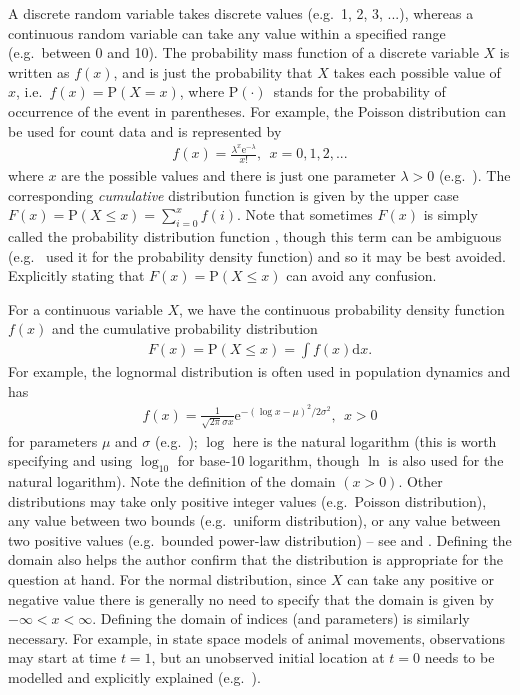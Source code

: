 \documentclass[12pt]{article}
\newcommand{\eb}{\begin{eqnarray}}
\newcommand{\ee}{\end{eqnarray}}
\begin{document}
A discrete random variable takes discrete values (e.g.~1, 2, 3, ...), whereas
a continuous random variable can take any value within a specified range 
(e.g.~between 0 and 10). The probability mass function of a discrete variable
$X$
is written as $f(x)$, and is just the probability that $X$ takes each possible
value of $x$, i.e.~$f(x) = \mbox{P}(X = x)$, where
P$(\cdot)$~stands for the probability of occurrence of the event in parentheses.
For example, the Poisson distribution can be used for count
data and is represented by
\eb
f(x) = \frac{\lambda^x \mbox{e}^{-\lambda}}{x!}, 
  ~~ x = 0, 1, 2, ...
\label{poisson}
\ee
where $x$ are the possible values and there is just one parameter $\lambda>0$
(e.g.~\citealt{bolk08}). The corresponding \emph{cumulative} distribution 
function is given by the upper case
$F(x) = \mbox{P}(X \leq x) = \sum_{i=0}^{x} f(i)$. 
Note that sometimes $F(x)$ is simply called the probability distribution 
function \citep{gs90}, though this term can be ambiguous (e.g.~\citealt{cw11}
used it for the probability density function) and so it may be best
avoided.
Explicitly stating that 
$F(x) = \mbox{P}(X \leq x)$ can avoid any confusion.

For a continuous variable $X$, we have the continuous probability density 
function $f(x)$ and the cumulative probability distribution 
\eb
F(x) = \mbox{P}(X \leq x) = \int f(x) \mbox{d}x. 
\ee
For example, the lognormal distribution is often used in population dynamics
and has
\eb
f(x) = \frac{1}{\sqrt{2 \pi} \sigma x} \mbox{e}^{-(\log x - \mu)^2 / 2
  \sigma^2}, ~~ x > 0
\label{lognormal}
\ee
for parameters $\mu$ and $\sigma$ (e.g.~\citealt{bolk08}); $\log$ here is
the natural logarithm (this is worth specifying and using $\log_{10}$ for
base-10 logarithm, though $\ln$ is also used for the natural logarithm).
Note the definition
of the domain $(x > 0)$. 
Other distributions may take only positive integer values 
(e.g.~Poisson distribution),
any value between two bounds (e.g.~uniform distribution), or any value 
between two positive values (e.g.~bounded power-law distribution) -- 
see \citet{bolk08} and \citet{erpbb17}. Defining the domain also helps the
author confirm that the distribution is appropriate for the 
question at hand. For the normal distribution, since $X$
can take any positive or negative value there is generally no need to
specify that the domain is given by $-\infty < x < \infty$.
Defining the domain of indices (and parameters) is similarly necessary. For
example, in state space models of animal movements, observations may start
at time $t=1$, but an unobserved initial location at $t=0$ needs to be modelled
and explicitly explained (e.g.~\citealt{augerm16}).
\end{document}
